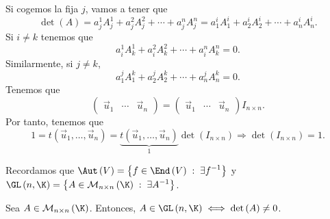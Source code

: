 Si cogemos la fija $\displaystyle j $, vamos a tener que 
\[\det\left(A\right) = a^{1}_{j}A^{1}_{j}+a^{2}_{j}A^{2}_{j}+\cdots+a^{n}_{j}A^{n}_{j} = a^{i}_{1}A^{i}_{1} + a^{i}_{2}A^{i}_{2} + \cdots + a^{i}_{n}A^{i}_{n} .\]
Si $\displaystyle i\neq k $ tenemos que
\[a^{1}_{i}A^{1}_{k} + a^{2}_{i}A^{2}_{k} + \cdots + a^{n}_{i}A^{n}_{k} = 0 .\]
Similarmente, si $\displaystyle j \neq k $,
\[a^{j}_{1}A^{k}_{1} + a^{j}_{2}A^{k}_{2} + \cdots + a^{j}_{n}A^{k}_{n} = 0 .\]
Tenemos que 
\[\begin{pmatrix} \vec{u}_{1} & \cdots & \vec{u}_{n} \end{pmatrix} = \begin{pmatrix} \vec{u}_{1} & \cdots & \vec{u}_{n} \end{pmatrix} I_{n\times n} .\]
Por tanto, tenemos que
\[1 = t\left(\vec{u}_{1}, \ldots, \vec{u}_{n}\right) = \underbrace{t\left(\vec{u}_{1}, \ldots, \vec{u}_{n}\right)}_{1}\det \left(I_{n \times n}\right) \Rightarrow \det\left(I_{ n \times n}\right) = 1 .\]

Recordamos que $\displaystyle \Aut\left(V\right) = \left\{ f \in \End\left(V\right) \; : \; \exists f^{-1}\right\}  $ y $\displaystyle \GL\left(n, \K\right) = \left\{ A \in \mathcal{M}_{n \times n}\left(\K\right) \; : \; \exists A^{-1}\right\}  $.
\begin{ftheorem}[]
\normalfont Sea $\displaystyle A \in \mathcal{M}_{ n \times n}\left(\K\right) $. Entonces, $\displaystyle A \in \GL\left(n, \K\right) \iff \det\left(A\right) \neq 0 $.
\end{ftheorem}

